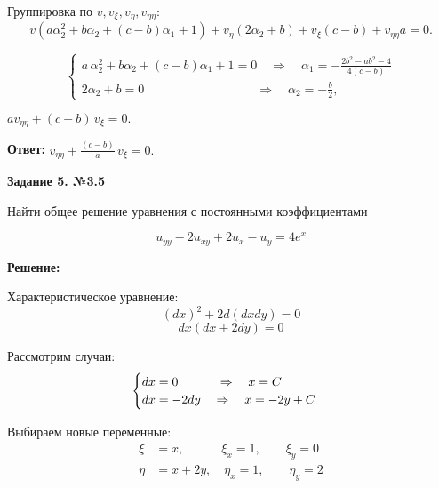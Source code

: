 \documentclass[a4paper,12pt]{article}
\begin{document}
Группировка по $ v, v_{\xi}, v_{\eta}, v_{\eta\eta} $:
\begin{equation*}
    v\left( a \alpha_2^2 + b \alpha_2 + (c - b) \alpha_1 + 1 \right) + 
    v_{\eta} \left( 2\alpha_2 + b \right) + 
    v_{\xi} (c - b) + 
    v_{\eta\eta} a = 0.
\end{equation*}

\begin{equation*}
 \begin{cases}
a\, \alpha_2^2 + b\alpha_2+(c - b) \alpha_1 + 1 = 0 \quad\Longrightarrow\quad \alpha_1 = -\frac{2b^2-ab^2-4}{4(c-b)} \\
2\alpha_2 + b = 0 \quad \quad \quad \quad \quad \quad \quad \quad \quad\Longrightarrow\quad \alpha_2 = -\frac{b}{2},
\end{cases}
\end{equation*}

$av_{\eta\eta} + (c - b)\,v_{\xi} = 0.$

\vspace{2mm}
\textbf{Ответ:} $v_{\eta\eta} + \frac{(c - b)}{a}\,v_{\xi} = 0.$

\begin{center}    
    \textbf{Задание 5. №3.5}
\end{center}

Найти общее решение уравнения с постоянными коэффициентами

\begin{equation*}
    u_{yy} - 2u_{xy} + 2u_x - u_y = 4e^x
\end{equation*}

\textbf{Решение:}

Характеристическое уравнение:
\begin{equation*}
    (dx)^2 + 2d(dx dy) = 0
\end{equation*}
\begin{equation*}
    dx (dx + 2 dy) = 0
\end{equation*}

Рассмотрим случаи:
\[
\begin{cases}
    dx = 0 \hspace{11mm} \Rightarrow \quad   x = C \\
    dx = -2dy \quad \Rightarrow \quad x = -2y + C
\end{cases}
\]

Выбираем новые переменные:
\begin{align*}
    \xi &= x,   \quad \quad \quad  \xi_x = 1,  \quad \quad \xi_y = 0 \\
    \eta &= x + 2y, \quad  \eta_x = 1, \quad \quad \eta_y = 2
\end{align*}
\end{document}
